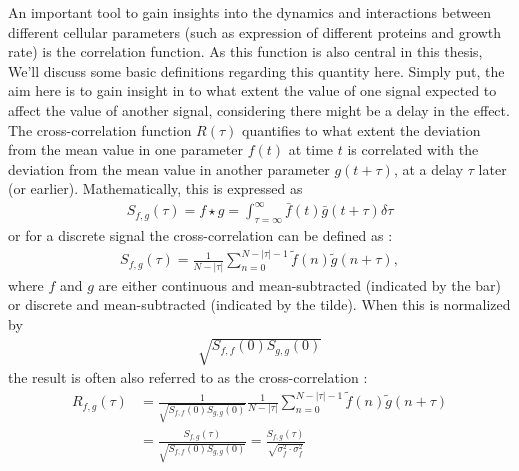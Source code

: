 An important tool to gain insights into the dynamics and interactions between different cellular parameters (such as expression of different proteins and growth rate) is the correlation function.
%
As this function is also central in this thesis, 
We'll discuss some basic definitions regarding this quantity here.
%
Simply put, the aim here is to gain insight in to what extent the value of one signal expected to affect the value of another signal, considering there might be a delay in the effect.
%
The cross-correlation function $R(\tau)$ quantifies to what extent the deviation from the mean value in one parameter $f(t)$ at time $t$ is correlated with the deviation from the mean value in another parameter $g(t+\tau)$, at a delay $\tau$ later (or earlier).
%
Mathematically, this is expressed as \cite[see lemma "Cross-Correlation"]{Weisstein2018}
\begin{align}
	\label{eq:CC}
		S_{f,g}(\tau) = f \star g = \int_{\tau=\infty}^{\infty} {\bar {f}(t) \bar{g}(t+\tau) \delta \tau}
\end{align}
or for a discrete signal the cross-correlation can be defined as \cite{Dunlop2008}:
\begin{align}
	\label{eq:CCdiscrete}
	S_{f,g}(\tau) = \frac{1}{N-|\tau|} 
		\sum_{n=0}^{N-|\tau|-1} {\tilde{f}(n) \tilde{g}(n+\tau)},
\end{align}
where $f$ and $g$ are either continuous and mean-subtracted (indicated by the bar) or discrete and mean-subtracted (indicated by the tilde). 
%
When this is normalized by 
\begin{align*}
\sqrt{S_{f,f}(0)S_{g,g}(0)}
\end{align*}
the result is often also referred to as the cross-correlation \cite{Munsky2012}:
%
\begin{align}
	\label{eq:R}
R_{f,g}(\tau) 
 	& = \frac{1}{\sqrt{S_{f,f}(0)S_{g,g}(0)}} \frac{1}{N-|\tau|} 
	\sum_{n=0}^{N-|\tau|-1} {\tilde{f}(n) \tilde{g}(n+\tau)} 
	\nonumber \\
	& =	\frac{S_{f,g}(\tau)}{\sqrt{S_{f,f}(0)S_{g,g}(0)}} 
	= \frac{S_{f,g}(\tau)}{\sqrt{\sigma^2_f\cdot\sigma^2_f}}
\end{align}
%
